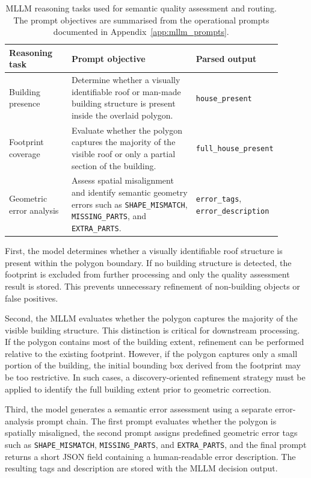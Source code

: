 \begin{table}[htb]
\centering
\small
\caption{MLLM reasoning tasks used for semantic quality assessment and routing. The prompt objectives are summarised from the operational prompts documented in Appendix~\ref{app:mllm_prompts}.}
\label{tab:mllm_reasoning_tasks}
\begin{tabular}{p{0.23\linewidth}p{0.46\linewidth}p{0.21\linewidth}}
\toprule
\textbf{Reasoning task} & \textbf{Prompt objective} & \textbf{Parsed output} \\
\midrule

Building presence &
Determine whether a visually identifiable roof or man-made building structure is present inside the overlaid polygon. &
\texttt{house\_present} \\

Footprint coverage &
Evaluate whether the polygon captures the majority of the visible roof or only a partial section of the building. &
\texttt{full\_house\_present} \\

Geometric error analysis &
Assess spatial misalignment and identify semantic geometry errors such as \texttt{SHAPE\_MISMATCH}, \texttt{MISSING\_PARTS}, and \texttt{EXTRA\_PARTS}. &
\texttt{error\_tags}, \texttt{error\_description} \\

\bottomrule
\end{tabular}
\end{table}

First, the model determines whether a visually identifiable roof structure is present within the polygon boundary. If no building structure is detected, the footprint is excluded from further processing and only the quality assessment result is stored. This prevents unnecessary refinement of non-building objects or false positives.

Second, the MLLM evaluates whether the polygon captures the majority of the visible building structure. This distinction is critical for downstream processing. If the polygon contains most of the building extent, refinement can be performed relative to the existing footprint. However, if the polygon captures only a small portion of the building, the initial bounding box derived from the footprint may be too restrictive. In such cases, a discovery-oriented refinement strategy must be applied to identify the full building extent prior to geometric correction.

Third, the model generates a semantic error assessment using a separate error-analysis prompt chain. The first prompt evaluates whether the polygon is spatially misaligned, the second prompt assigns predefined geometric error tags such as \texttt{SHAPE\_MISMATCH}, \texttt{MISSING\_PARTS}, and \texttt{EXTRA\_PARTS}, and the final prompt returns a short JSON field containing a human-readable error description. The resulting tags and description are stored with the MLLM decision output.

